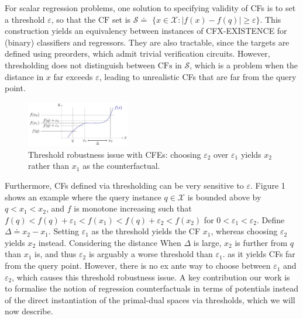 
For scalar regression problems, one solution to specifying validity of CFs is to set a threshold $\varepsilon$, so that the $\mathrm{CF}$ set is $\mathcal{S} \doteq$ $\{x \in \mathcal{X}:|f(x)-f(q)| \geq \varepsilon\}$. This construction yields an equivalency between instances of CFX-EXISTENCE for (binary) classifiers and regressors. They are also tractable, since the targets are defined using preorders, which admit trivial verification circuits. However, thresholding does not distinguish between $\mathrm{CFs}$ in $\mathcal{S}$, which is a problem when the distance in $x$ far exceeds $\varepsilon$, leading to unrealistic CFs that are far from the query point.

\begin{figure}[h]
    \centering
    \includegraphics[width=0.4\textwidth]{images/potential.jpg}
    \caption{Threshold robustness issue with CFEs: choosing $\varepsilon_{2}$ over $\varepsilon_{1}$ yields $x_{2}$ rather than $x_{1}$ as the counterfactual.}
\end{figure}

 Furthermore, CFs defined via thresholding can be very sensitive to $\varepsilon$. Figure 1 shows an example where the query instance $q \in \mathcal{X}$ is bounded above by $q<x_{1}<x_{2}$, and $f$ is monotone increasing such that $f(q)<f(q)+\varepsilon_{1}<f\left(x_{1}\right)<f(q)+\varepsilon_{2}<f\left(x_{2}\right)$ for $0<\varepsilon_{1}<\varepsilon_{2}$. Define $\Delta \doteq x_{2}-x_{1}$. Setting $\varepsilon_{1}$ as the threshold yields the CF $x_{1}$, whereas choosing $\varepsilon_{2}$ yields $x_{2}$ instead. Considering the distance When $\Delta$ is large, $x_{2}$ is further from $q$ than $x_{1}$ is, and thus $\varepsilon_{2}$ is arguably a worse threshold than $\varepsilon_{1}$. as it yields CFs far from the query point. However, there is no ex ante way to choose between $\varepsilon_{1}$ and $\varepsilon_{2}$, which causes this threshold robustness issue. A key contribution our work is to formalise the notion of regression counterfactuals in terms of potentials instead of the direct instantiation of the primal-dual spaces via thresholds, which we will now describe.

